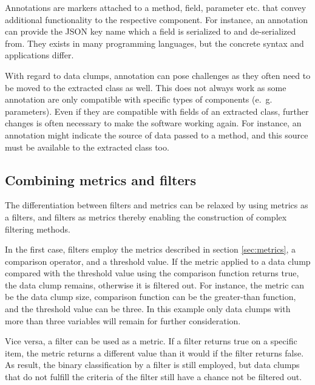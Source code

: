Annotations are markers attached to a method, field, parameter etc. that convey additional functionality to the respective component. For instance, an annotation can provide the \ac{JSON} key name which a field is serialized to and de-serialized from.  They exists in many programming languages, but the concrete syntax and applications differ.

With regard to data clumps, annotation can pose challenges as they often need to be moved to the extracted class as well. This does not always work as some annotation are only compatible with specific types of components (e.~g. parameters). Even if they are compatible with fields of an extracted class, further changes is often necessary to make the software working again. For instance, an annotation might indicate the source of data passed to a method, and this source must be available to the extracted class too. 

\subsection{Combining metrics and filters}

The differentiation between filters and metrics can be relaxed by using metrics as a filters, and filters as metrics thereby enabling the construction of complex filtering methods. 

In the first case, filters employ the metrics described in section \ref{sec:metrics}, a comparison operator, and a threshold value. If the metric applied to a data clump compared with the threshold value using the comparison function returns true, the data clump remains, otherwise it is filtered out. For instance, the metric can be the data clump size, comparison function can be the greater-than function, and the threshold value can be three. In this example only data clumps with more than three variables will remain for further consideration. 

Vice versa, a filter can be used as a metric. If a filter returns true on a specific item, the metric returns a different value than it would if the filter returns false. As result, the binary classification by a filter is still employed, but data clumps that do not fulfill the criteria of the filter still have a chance not be filtered out. 

